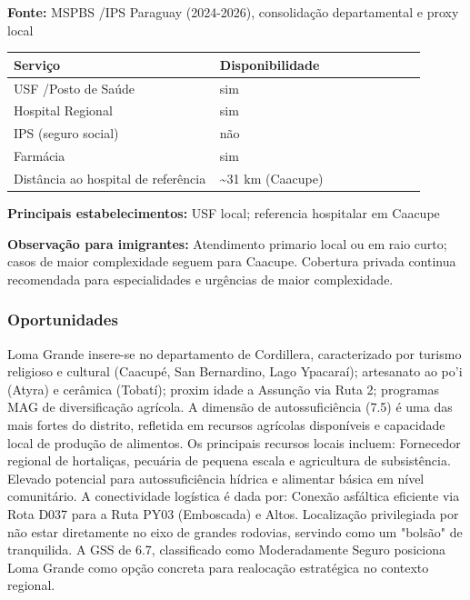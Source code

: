 \textbf{Fonte:} MSPBS /\allowbreak  IPS Paraguay (2024-2026), consolidação
departamental e proxy local

{\def\LTcaptype{none} %
\begin{longtable}{@{}>{\raggedright\arraybackslash}p{0.45\linewidth} >{\raggedright\arraybackslash}p{0.45\linewidth}@{}}
\toprule\noalign{}
Serviço & Disponibilidade \\
\midrule\noalign{}
\endhead
\bottomrule\noalign{}
\endlastfoot
USF /\allowbreak  Posto de Saúde & sim \\
Hospital Regional & sim \\
IPS (seguro social) & não \\
Farmácia & sim \\
Distância ao hospital de referência & \textasciitilde31 km (Caacupe) \\
\end{longtable}
}

\textbf{Principais estabelecimentos:} USF local; referencia hospitalar
em Caacupe

\textbf{Observação para imigrantes:} Atendimento primario local ou em
raio curto; casos de maior complexidade seguem para Caacupe. Cobertura
privada continua recomendada para especialidades e urgências de maior
complexidade.
\newpage

\subsubsection*{Oportunidades}\label{oport-loma-grande-0311}
Loma Grande insere-se no departamento de Cordillera, caracterizado por turismo religioso e cultural (Caacupé, San Bernardino, Lago Ypacaraí); artesanato ao po'i (Atyra) e cerâmica (Tobatí); proxim idade a Assunção via Ruta 2; programas MAG de diversificação agrícola. A dimensão de autossuficiência (7.5) é uma das mais fortes do distrito, refletida em recursos agrícolas disponíveis e capacidade local de produção de alimentos. Os principais recursos locais incluem: Fornecedor regional de hortaliças, pecuária de pequena escala e agricultura de subsistência. Elevado potencial para autossuficiência hídrica e alimentar básica em nível comunitário. A conectividade logística é dada por: Conexão asfáltica eficiente via Rota D037 para a Ruta PY03 (Emboscada) e Altos. Localização privilegiada por não estar diretamente no eixo de grandes rodovias, servindo como um "bolsão" de tranquilida. A GSS de 6.7, classificado como Moderadamente Seguro posiciona Loma Grande como opção concreta para realocação estratégica no contexto regional.


